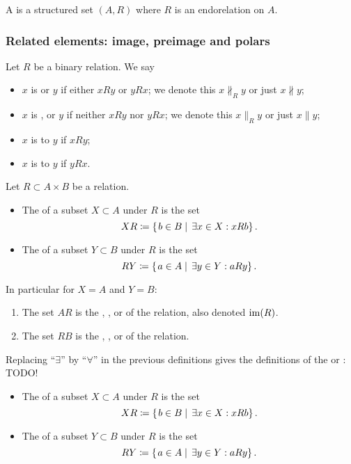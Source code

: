\begin{definition}
A  is a structured set $(A, R)$ where $R$ is an endorelation on $A$.
\end{definition}

\subsubsection{Related elements: image, preimage and polars}
\begin{definition}
Let $R$ be a binary relation. We say
\begin{itemize}
\item $x$ is  or  $y$ if either $xRy$ or $yRx$; we denote this $x\nparallel_R y$ or just $x\nparallel y$;
\item $x$ is ,  or  $y$ if neither $xRy$ nor $yRx$; we denote this $x\parallel_R y$ or just $x\parallel y$;
\item $x$ is  to $y$ if $xRy$;
\item $x$ is  to $y$ if $yRx$.
\end{itemize}
\end{definition}

\begin{definition}
Let $R\subset A\times B$ be a relation.
\begin{itemize}
\item The  of a subset $X\subset A$ under $R$ is the set
\[ XR \coloneqq \left\{\left. b\in B \;\right|\; \exists x\in X: xRb \right\}. \]
\item The  of a subset $Y\subset B$ under $R$ is the set
\[ RY \coloneqq \left\{\left. a\in A \;\right|\; \exists y\in Y: aRy \right\}. \]
\end{itemize}
In particular for $X=A$ and $Y=B$:
\begin{enumerate}
\item The set $AR$ is the , ,  or  of the relation, also denoted $\operatorname{im}(R)$.
\item The set $RB$ is the , ,  or  of the relation.
\end{enumerate}
Replacing ``$\exists$'' by ``$\forall$'' in the previous definitions gives the definitions of the  or : TODO!
\begin{itemize}
\item The  of a subset $X\subset A$ under $R$ is the set
\[ XR \coloneqq \left\{\left. b\in B \;\right|\; \exists x\in X: xRb \right\}. \]
\item The  of a subset $Y\subset B$ under $R$ is the set
\[ RY \coloneqq \left\{\left. a\in A \;\right|\; \exists y\in Y: aRy \right\}. \]
\end{itemize}
\end{definition}

